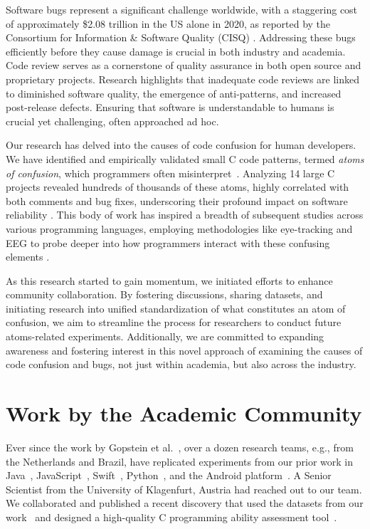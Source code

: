 \documentclass[conference]{IEEEtran}
\begin{document}
Software bugs represent a significant challenge worldwide, 
with a staggering cost of approximately \$2.08 trillion in the 
US alone in 2020, as reported by the Consortium for 
Information \& Software Quality (CISQ) \cite{CPSQ2020}. 
Addressing these bugs efficiently before they cause damage is 
crucial in both industry and academia.
%
Code review serves as a cornerstone of quality assurance in 
both open source and proprietary projects. Research highlights 
that inadequate code reviews are linked to diminished software 
quality, the emergence of anti-patterns, and increased 
post-release defects.  Ensuring that software is understandable to 
humans is crucial yet challenging, often approached ad hoc.

Our research has delved into the causes of code confusion for 
human developers. We have identified and empirically validated 
small C code patterns, termed \emph{atoms of confusion}, which 
programmers often misinterpret~\cite{gopstein2017understanding}. Analyzing 14 large C projects 
revealed hundreds of thousands of these atoms, highly 
correlated with both comments and bug fixes, underscoring 
their profound impact on software reliability 
\cite{gopstein2018prevalence}.
%
This body of work has inspired a breadth of subsequent studies 
across various programming languages, employing methodologies 
like eye-tracking and EEG to probe deeper into how programmers 
interact with these confusing elements 
\cite{langhout2021atoms, mendes2021bohr, mendes2022dazed, 
torres2023investigation, dacosta2023seeing, 
Manor2018AtomsConfusionSwift, yeh2017detecting}.

As this research started to gain momentum, we initiated 
efforts to enhance community collaboration. By fostering 
discussions, sharing datasets, and initiating research into 
unified standardization of what constitutes an atom of 
confusion, we aim to streamline the process for researchers to 
conduct future atoms-related experiments. Additionally, we are 
committed to expanding awareness and fostering interest in 
this novel approach of examining the causes of code confusion 
and bugs, not just within academia, but also across the 
industry.

\section{Work by the Academic Community}

Ever since the work by Gopstein et al.~\cite{gopstein2017understanding}, over a dozen research teams, e.g., from the Netherlands and Brazil, have replicated experiments from our prior work in Java~\cite{langhout2021atoms, mendes2022dazed}, JavaScript~\cite{oliveira2019impact},  Swift~\cite{castor2018identifying}, Python~\cite{da2023seeing}, and the Android platform~\cite{tabosa2024dataset}.  A Senior Scientist from the University of Klagenfurt, Austria had reached out to our team. We collaborated and published a recent discovery that used the datasets from our work~\cite{gopstein2017understanding, zhuang2023developer} and designed a high-quality C programming ability assessment tool~\cite{glasauer2024c}.
\end{document}
